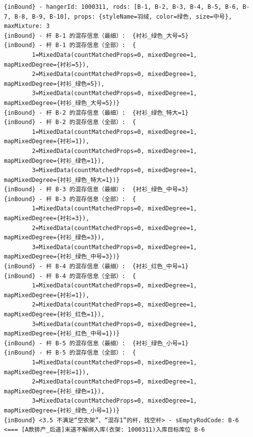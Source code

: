 {\begin{verbatim}
{inBound} - hangerId: 1000311, rods: [B-1, B-2, B-3, B-4, B-5, B-6, B-7, B-8, B-9, B-10], props: {styleName=羽绒, color=绿色, size=中号}, maxMixture: 3
{inBound} - 杆 B-1 的混存信息（最细）:  {衬衫_绿色_大号=5}
{inBound} - 杆 B-1 的混存信息（全部）:  {
		1=MixedData(countMatchedProps=0, mixedDegree=1, mapMixedDegree={衬衫=5}), 
		2=MixedData(countMatchedProps=0, mixedDegree=1, mapMixedDegree={衬衫_绿色=5}), 
		3=MixedData(countMatchedProps=0, mixedDegree=1, mapMixedDegree={衬衫_绿色_大号=5})}
{inBound} - 杆 B-2 的混存信息（最细）:  {衬衫_绿色_特大=1}
{inBound} - 杆 B-2 的混存信息（全部）:  {
		1=MixedData(countMatchedProps=0, mixedDegree=1, mapMixedDegree={衬衫=1}), 
		2=MixedData(countMatchedProps=0, mixedDegree=1, mapMixedDegree={衬衫_绿色=1}), 
		3=MixedData(countMatchedProps=0, mixedDegree=1, mapMixedDegree={衬衫_绿色_特大=1})}
{inBound} - 杆 B-3 的混存信息（最细）:  {衬衫_绿色_中号=3}
{inBound} - 杆 B-3 的混存信息（全部）:  {
		1=MixedData(countMatchedProps=0, mixedDegree=1, mapMixedDegree={衬衫=3}), 
		2=MixedData(countMatchedProps=0, mixedDegree=1, mapMixedDegree={衬衫_绿色=3}), 
		3=MixedData(countMatchedProps=0, mixedDegree=1, mapMixedDegree={衬衫_绿色_中号=3})}
{inBound} - 杆 B-4 的混存信息（最细）:  {衬衫_红色_中号=1}
{inBound} - 杆 B-4 的混存信息（全部）:  {
		1=MixedData(countMatchedProps=0, mixedDegree=1, mapMixedDegree={衬衫=1}), 
		2=MixedData(countMatchedProps=0, mixedDegree=1, mapMixedDegree={衬衫_红色=1}), 
		3=MixedData(countMatchedProps=0, mixedDegree=1, mapMixedDegree={衬衫_红色_中号=1})}
{inBound} - 杆 B-5 的混存信息（最细）:  {衬衫_绿色_小号=1}
{inBound} - 杆 B-5 的混存信息（全部）:  {
		1=MixedData(countMatchedProps=0, mixedDegree=1, mapMixedDegree={衬衫=1}), 
		2=MixedData(countMatchedProps=0, mixedDegree=1, mapMixedDegree={衬衫_绿色=1}), 
		3=MixedData(countMatchedProps=0, mixedDegree=1, mapMixedDegree={衬衫_绿色_小号=1})}
{inBound} <3.5 不满足“空衣架”、“混存1”的杆，找空杆> - sEmptyRodCode: B-6
<=== [A款排产_后道]末道不解绑入库(衣架: 1000311)入库目标库位 B-6


\end{verbatim}}
